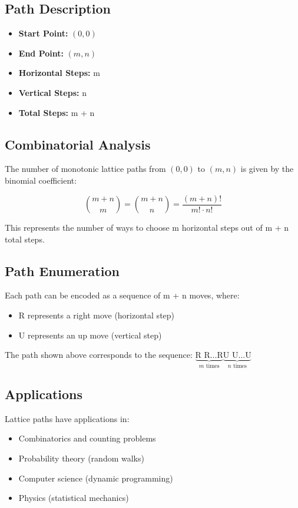 \documentclass[12pt,a4paper]{article}
\begin{document}
\subsection{Path Description}
\begin{itemize}
    \item \textbf{Start Point:} $(0, 0)$
    \item \textbf{End Point:} $({{ m }}, {{ n }})$
    \item \textbf{Horizontal Steps:} {{ m }}
    \item \textbf{Vertical Steps:} {{ n }}
    \item \textbf{Total Steps:} {{ m + n }}
\end{itemize}

\subsection{Combinatorial Analysis}
The number of monotonic lattice paths from $(0,0)$ to $({{ m }}, {{ n }})$ is given by the binomial coefficient:

\[
\binom{{{ m + n }}}{{{ m }}} = \binom{{{ m + n }}}{{{ n }}} = \frac{({{ m + n }})!}{{{ m }}! \cdot {{ n }}!}
\]

This represents the number of ways to choose {{ m }} horizontal steps out of {{ m + n }} total steps.

\subsection{Path Enumeration}
Each path can be encoded as a sequence of {{ m + n }} moves, where:
\begin{itemize}
    \item R represents a right move (horizontal step)
    \item U represents an up move (vertical step)
\end{itemize}

The path shown above corresponds to the sequence: $\underbrace{\text{R R} \ldots \text{R}}_{{{ m }} \text{ times}} \underbrace{\text{U U} \ldots \text{U}}_{{{ n }} \text{ times}}$

\subsection{Applications}
Lattice paths have applications in:
\begin{itemize}
    \item Combinatorics and counting problems
    \item Probability theory (random walks)
    \item Computer science (dynamic programming)
    \item Physics (statistical mechanics)
\end{itemize}
\end{document}
